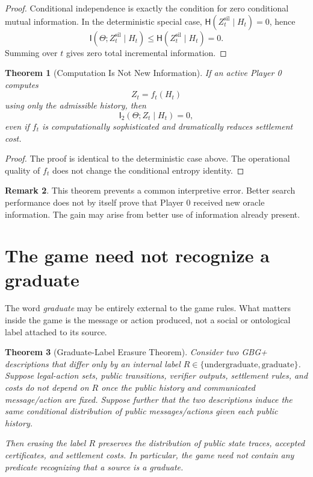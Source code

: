 \documentclass[11pt]{article}
\newtheorem{theorem}{Theorem}[section]
\theoremstyle{definition}
\newtheorem{remark}[theorem]{Remark}
\newcommand{\I}{\mathsf{I}}
\newcommand{\Hh}{\mathsf{H}}
\newcommand{\sil}{\mathrm{sil}}
\begin{document}
\begin{proof}
Conditional independence is exactly the condition for zero conditional mutual information.  In the deterministic special case, $\Hh(Z_t^{\sil}\mid H_t)=0$, hence
\[
\I(\Theta;Z_t^{\sil}\mid H_t)
\le \Hh(Z_t^{\sil}\mid H_t)=0.
\]
Summing over $t$ gives zero total incremental information.
\end{proof}

\begin{theorem}[Computation Is Not New Information]
If an active Player 0 computes
\[
Z_t=f_t(H_t)
\]
using only the admissible history, then
\[
\I_2(\Theta;Z_t\mid H_t)=0,
\]
even if $f_t$ is computationally sophisticated and dramatically reduces settlement cost.
\end{theorem}

\begin{proof}
The proof is identical to the deterministic case above.  The operational quality of $f_t$ does not change the conditional entropy identity.
\end{proof}

\begin{remark}
This theorem prevents a common interpretive error.  Better search performance does not by itself prove that Player 0 received new oracle information.  The gain may arise from better use of information already present.
\end{remark}

\section{The game need not recognize a graduate}

The word \emph{graduate} may be entirely external to the game rules.  What matters inside the game is the message or action produced, not a social or ontological label attached to its source.

\begin{theorem}[Graduate-Label Erasure Theorem]
Consider two GBG+ descriptions that differ only by an internal label $R\in\{\mathrm{undergraduate},\mathrm{graduate}\}$.  Suppose legal-action sets, public transitions, verifier outputs, settlement rules, and costs do not depend on $R$ once the public history and communicated message/action are fixed.  Suppose further that the two descriptions induce the same conditional distribution of public messages/actions given each public history.

Then erasing the label $R$ preserves the distribution of public state traces, accepted certificates, and settlement costs.  In particular, the game need not contain any predicate recognizing that a source is a graduate.
\end{theorem}
\end{document}
